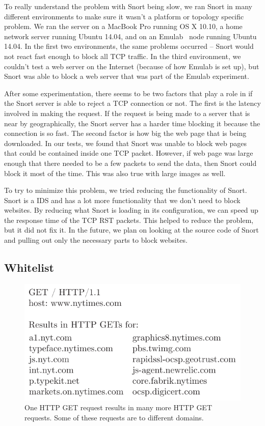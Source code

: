 To really understand the problem with Snort being slow, we ran Snort in many
different environments to make sure it wasn't a platform or topology specific
problem. We ran the server on a MacBook Pro running OS X 10.10, a home network
server running Ubuntu 14.04, and on an Emulab~\cite{emulab} node running Ubuntu
14.04. In the first two environments, the same problems occurred -- Snort would
not react fast enough to block all TCP traffic. In the third environment, we
couldn't test a web server on the Internet (because of how Emulab is set up),
but Snort was able to block a web server that was part of the Emulab
experiment.

After some experimentation, there seems to be two factors that play a role in
if the Snort server is able to reject a TCP connection or not. The first is the
latency involved in making the request. If the request is being made to a
server that is near by geographically, the Snort server has a harder time
blocking it because the connection is so fast. The second factor is how big the
web page that is being downloaded. In our tests, we found that Snort was unable
to block web pages that could be contained inside one TCP packet. However, if
web page was large enough that there needed to be a few packets to send the
data, then Snort could block it most of the time. This was also true with large
images as well.

To try to minimize this problem, we tried reducing the functionality of Snort.
Snort is a IDS and has a lot more functionality that we don't need to block
websites. By reducing what Snort is loading in its configuration, we can speed
up the response time of the TCP RST packets. This helped to reduce the problem,
but it did not fix it. In the future, we plan on looking at the source code of
Snort and pulling out only the necessary parts to block websites.


\subsection{Whitelist}

\begin{figure}[!htb]
    \centering
    \includegraphics[width=\columnwidth]{figures/http_get}
    \caption{One HTTP GET request results in many more HTTP GET requests. Some
    of these requests are to different domains.}
    \label{fig:http_get}
\end{figure}

